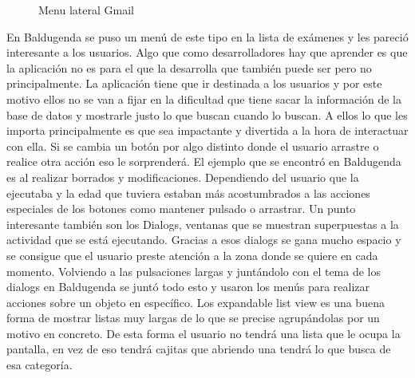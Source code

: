 \begin{figure}[H] 
  \begin{center} 
    \caption{Menu lateral Gmail} 
    \label{fig:MenuLateral} 
  \end{center} 
\end{figure}

En Baldugenda se puso un menú de este tipo en la lista de exámenes y les pareció interesante a los usuarios.
Algo que como desarrolladores hay que aprender es que la aplicación no es para el que la desarrolla que también puede ser pero no principalmente. La aplicación tiene que ir destinada a los usuarios y por este motivo ellos no se van a fijar en la dificultad que tiene sacar la información de la base de datos y mostrarle justo lo que buscan cuando lo buscan.
A ellos lo que les importa principalmente es que sea impactante y divertida a la hora de interactuar con ella.
Si se cambia un botón por algo distinto donde el usuario arrastre o realice otra acción eso le sorprenderá.
El ejemplo que se encontró en Baldugenda es al realizar borrados y modificaciones.
Dependiendo del usuario que la ejecutaba y la edad que tuviera estaban más acostumbrados a las acciones especiales de los botones como mantener pulsado o arrastrar.
Un punto interesante también son los Dialogs, ventanas que se muestran superpuestas a la actividad que se está ejecutando. Gracias a esos dialogs se gana mucho espacio y se consigue que el usuario preste atención a la zona donde se quiere en cada momento.
Volviendo a las pulsaciones largas y juntándolo con el tema de los dialogs en Baldugenda se juntó todo esto y usaron los menús para realizar acciones sobre un objeto en específico.
Los expandable list view es una buena forma de mostrar listas muy largas de lo que se precise agrupándolas por un motivo en concreto.
De esta forma el usuario no tendrá una lista que le ocupa la pantalla, en vez de eso tendrá cajitas que abriendo una tendrá lo que busca de esa categoría.


